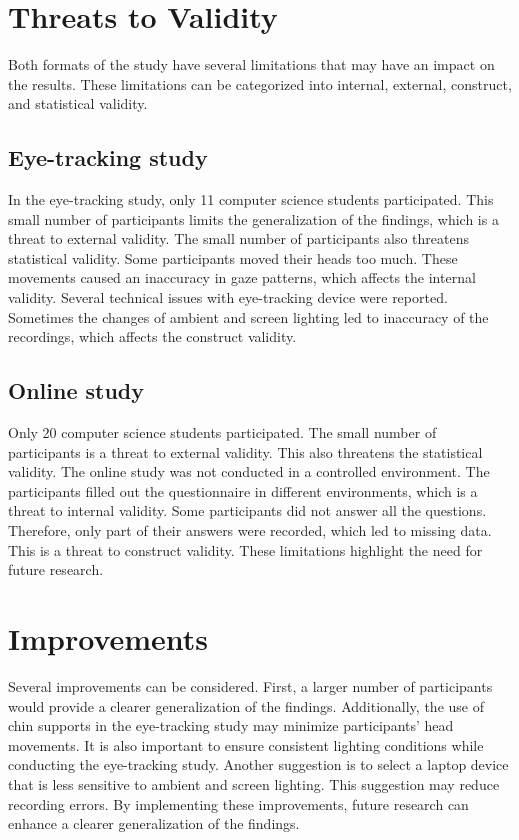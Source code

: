 \section{Threats to Validity} 
Both formats of the study have several limitations that may have an impact on the results. These limitations can be categorized into internal, external, construct, and statistical validity.

\subsection{Eye-tracking study} 

In the eye-tracking study, only 11 computer science students participated. This small number of participants limits the generalization of the findings, which is a threat to external validity. The small number of participants also threatens statistical validity. Some participants moved their heads too much. These movements caused an inaccuracy in gaze patterns, which affects the internal validity. Several technical issues with eye-tracking device were reported. Sometimes the changes of ambient and screen lighting led to inaccuracy of the recordings, which affects the construct validity.


\subsection{Online study} 

Only 20 computer science students participated. The small number of participants is a threat to external validity. This also threatens the statistical validity. The online study was not conducted in a controlled environment. The participants filled out the questionnaire in different environments, which is a threat to internal validity.
Some participants did not answer all the questions. Therefore, only part of their answers were recorded, which led to missing data. This is a threat to construct validity.
These limitations highlight the need for future research.



\section{Improvements}

Several improvements can be considered. First, a larger number of participants would provide a clearer generalization of the findings. Additionally, the use of chin supports in the eye-tracking study may minimize participants’ head movements. It is also important to ensure consistent lighting conditions while conducting the eye-tracking study. Another suggestion is to select a laptop device that is less sensitive to ambient and screen lighting. This suggestion may reduce recording errors. By implementing these improvements, future research can enhance a clearer generalization of the findings. 





